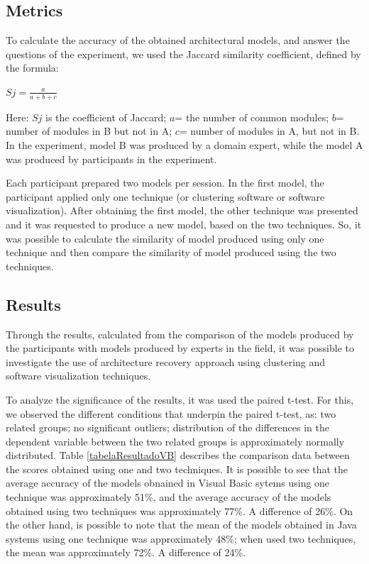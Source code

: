 \documentclass{sig-alternate-05-2015}
\begin{document}
\subsection{Metrics}%
To calculate the accuracy of the obtained architectural models, and answer the questions of the experiment, we used the Jaccard similarity coefficient, defined by the formula:
\begin{center}
	$Sj= \frac{a}{a+b+c}$
\end{center}

Here: $Sj$ is the coefficient of Jaccard; $a$= the number of common modules; $b$= number of modules in B but not in A; $c$= number of modules in A, but not in B. In the experiment, model B was produced by a domain expert, while the model A was produced by participants in the experiment.

Each participant prepared two models per session. In the first model, the participant applied only one technique (or clustering software or software visualization). After obtaining the first model, the other technique was presented and it was requested to produce a new model, based on the two techniques. So, it was possible to calculate the similarity of model produced using only one technique and then compare the similarity of model produced using the two techniques.

\subsection{Results}%

Through the results, calculated from the comparison of the models produced by the participants with models produced by experts in the field, it was possible to investigate the use of architecture recovery approach using clustering and software visualization techniques. 

To analyze the significance of the results, it was used the paired t-test. For this, we observed the different conditions that underpin the paired t-test, as: two related groups; no significant outliers; distribution of the differences in the dependent variable between the two related groups is approximately normally distributed.  Table \ref{tabelaResultadoVB}  describes the comparison data between the scores obtained using one and two techniques. It is possible to see that the average accuracy of the models obnained in Visual Basic sytems using one technique was approximately 51\%, and the average accuracy of the models obtained using two techniques was approximately 77\%. A difference of 26\%. On the other hand,  is possible to note that the mean of the models obtained in Java systems using one technique was approximately 48\%; when used two techniques, the mean was approximately 72\%. A difference of 24\%.
\end{document}
